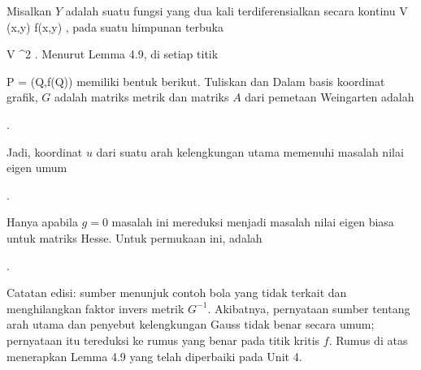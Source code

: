 {

Misalkan $Y$ adalah
suatu fungsi yang dua kali terdiferensialkan secara kontinu
 { V } { \R
} {(x,y)} { f(x,y)
} {,}
pada suatu himpunan terbuka

\mavergleichskette
{\vergleichskette
{ V
}
{ \subseteq }{ \R^2
}
{  }{
}
{    }{
}
{   }{
}
}
{}{}{.}
Menurut
Lemma 4.9,
 {} {}
di setiap titik

\mavergleichskette
{\vergleichskette
{ P
}
{ = }{ (Q,f(Q))
}
{  }{
}
{    }{
}
{   }{
}
}
{}{}{}
memiliki bentuk berikut. Tuliskan
dan
Dalam basis koordinat grafik, $G$ adalah matriks metrik dan matriks $A$ dari pemetaan Weingarten adalah

 { . }

Jadi, koordinat $u$ dari suatu arah kelengkungan utama memenuhi masalah nilai eigen umum

 { . }

Hanya apabila $g=0$ masalah ini mereduksi menjadi masalah nilai eigen biasa untuk matriks Hesse. Untuk permukaan ini,
adalah

 { . }

Catatan edisi: sumber menunjuk contoh bola yang tidak terkait dan menghilangkan faktor invers metrik $G^{-1}$. Akibatnya, pernyataan sumber tentang arah utama dan penyebut kelengkungan Gauss tidak benar secara umum; pernyataan itu tereduksi ke rumus yang benar pada titik kritis $f$. Rumus di atas menerapkan Lemma 4.9 yang telah diperbaiki pada Unit 4.

}

